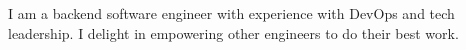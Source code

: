 
\begin{cvparagraph}

	I am a backend software engineer with experience with DevOps and tech
	leadership. I delight in empowering other engineers to do their best work. 

\end{cvparagraph}
